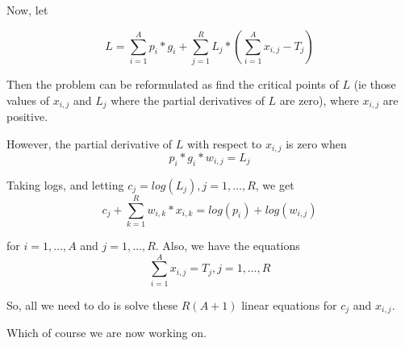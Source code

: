 \documentclass[10pt]{article}
\begin{document}
Now, let

\begin{equation}
   L = \sum_{i=1}^A p_i*g_i + \sum_{j=1}^R L_j*(\sum_{i=1}^A x_{i,j}-T_j)
\end{equation}

Then the problem can be reformulated as find the critical points of $L$ (ie
those values of $x_{i,j}$ and $L_j$ where the partial derivatives of $L$ are
zero), where $x_{i,j}$ are positive.

However, the partial derivative of $L$ with respect to $x_{i,j}$ is zero when
\begin{equation}
         p_i*g_i*w_{i,j} = L_j
\end{equation}

Taking logs, and letting $c_j = log(L_j), j = 1,\ldots,R$, we get
\begin{equation}
         c_j + \sum_{k=1}^R w_{i,k}*x_{i,k} = log(p_i) + log(w_{i,j})
\end{equation}

for $i = 1,\ldots,A$ and $j = 1,\ldots,R$. Also, we have the equations
\begin{equation}
         \sum_{i=1}^A x_{i,j} = T_j, j=1,\ldots,R
\end{equation}

So, all we need to do is solve these $R(A+1)$ linear equations for $c_j$ and
$x_{i,j}$.

Which of course we are now working on.
\end{document}
